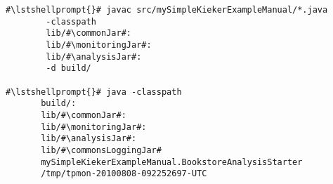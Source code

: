 \begin{lstlisting}[caption=Compile and run under Linux,label=lst:bookstoreAnalysisStarterLinux] 			
#\lstshellprompt{}# javac src/mySimpleKiekerExampleManual/*.java
        -classpath	
        lib/#\commonJar#:
        lib/#\monitoringJar#:
        lib/#\analysisJar#:
        -d build/

#\lstshellprompt{}# java -classpath
       build/:
       lib/#\commonJar#:
       lib/#\monitoringJar#:
       lib/#\analysisJar#:
       lib/#\commonsLoggingJar#
       mySimpleKiekerExampleManual.BookstoreAnalysisStarter 
       /tmp/tpmon-20100808-092252697-UTC
\end{lstlisting}	
